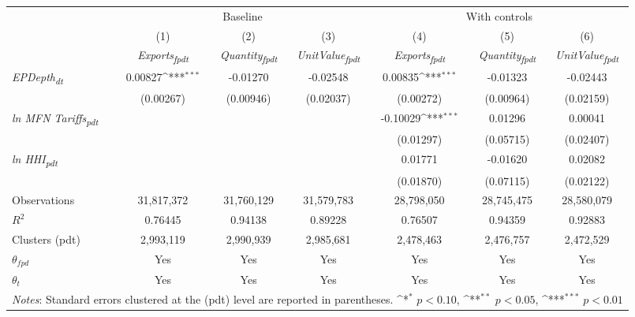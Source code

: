 {
\def\sym#1{\ifmmode^{#1}\else\(^{#1}\)\fi}
\begin{tabular}{l*{6}{c}}
\toprule
&\multicolumn{3}{c}{Baseline}&\multicolumn{3}{c}{With controls}\\\cmidrule(lr){2-4}\cmidrule(lr){5-7}
&(1)&(2)&(3)&(4)&(5)&(6)\\
&\textit{Exports\textsubscript{fpdt}}&\textit{Quantity\textsubscript{fpdt}}&\textit{UnitValue\textsubscript{fpdt}}&\textit{Exports\textsubscript{fpdt}}&\textit{Quantity\textsubscript{fpdt}}&\textit{UnitValue\textsubscript{fpdt}}\\
\midrule
\textit{EPDepth\textsubscript{dt}} & 0.00827\sym{***} & -0.01270 & -0.02548 & 0.00835\sym{***} & -0.01323 & -0.02443\\
 & (0.00267) & (0.00946) & (0.02037) & (0.00272) & (0.00964) & (0.02159)\\
\addlinespace
\textit{ln MFN Tariffs\textsubscript{pdt}} &  &  &  & -0.10029\sym{***} & 0.01296 & 0.00041\\
 &  &  &  & (0.01297) & (0.05715) & (0.02407)\\
\addlinespace
\textit{ln HHI\textsubscript{pdt}} &  &  &  & 0.01771 & -0.01620 & 0.02082\\
 &  &  &  & (0.01870) & (0.07115) & (0.02122)\\
\midrule
Observations & 31,817,372 & 31,760,129 & 31,579,783 & 28,798,050 & 28,745,475 & 28,580,079\\
$R^{2}$ & 0.76445 & 0.94138 & 0.89228 & 0.76507 & 0.94359 & 0.92883\\
Clusters (pdt) & 2,993,119 & 2,990,939 & 2,985,681 & 2,478,463 & 2,476,757 & 2,472,529\\
$\theta_{fpd}$ & Yes & Yes & Yes & Yes & Yes & Yes\\
$\theta_{t}$ & Yes & Yes & Yes & Yes & Yes & Yes\\
\bottomrule
\multicolumn{7}{l}{\footnotesize \textit{Notes}: Standard errors clustered at the (pdt) level are reported in parentheses. \sym{*} \(p<0.10\), \sym{**} \(p<0.05\), \sym{***} \(p<0.01\)}\\
\end{tabular}
}
